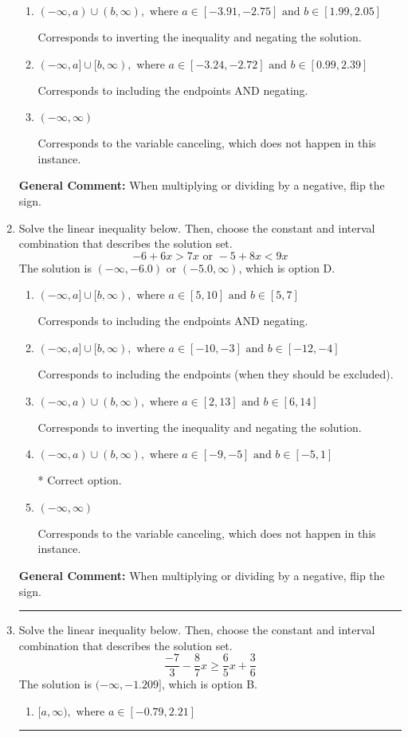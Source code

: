 \documentclass{extbook}[14pt]
\newcommand{\litem}[1]{\item #1

\rule{\textwidth}{0.4pt}}
\begin{document}
\begin{enumerate}
{\begin{enumerate}[label=\Alph*.]
 * Correct option.
\item \( (-\infty, a) \cup (b, \infty), \text{ where } a \in [-3.91, -2.75] \text{ and } b \in [1.99, 2.05] \)

Corresponds to inverting the inequality and negating the solution.
\item \( (-\infty, a] \cup [b, \infty), \text{ where } a \in [-3.24, -2.72] \text{ and } b \in [0.99, 2.39] \)

Corresponds to including the endpoints AND negating.
\item \( (-\infty, \infty) \)

Corresponds to the variable canceling, which does not happen in this instance.
\end{enumerate}

\textbf{General Comment:} When multiplying or dividing by a negative, flip the sign.
}
\litem{
Solve the linear inequality below. Then, choose the constant and interval combination that describes the solution set.
\[ -6 + 6 x > 7 x \text{ or } -5 + 8 x < 9 x \]The solution is \( (-\infty, -6.0) \text{ or } (-5.0, \infty) \), which is option D.\begin{enumerate}[label=\Alph*.]
\item \( (-\infty, a] \cup [b, \infty), \text{ where } a \in [5, 10] \text{ and } b \in [5, 7] \)

Corresponds to including the endpoints AND negating.
\item \( (-\infty, a] \cup [b, \infty), \text{ where } a \in [-10, -3] \text{ and } b \in [-12, -4] \)

Corresponds to including the endpoints (when they should be excluded).
\item \( (-\infty, a) \cup (b, \infty), \text{ where } a \in [2, 13] \text{ and } b \in [6, 14] \)

Corresponds to inverting the inequality and negating the solution.
\item \( (-\infty, a) \cup (b, \infty), \text{ where } a \in [-9, -5] \text{ and } b \in [-5, 1] \)

 * Correct option.
\item \( (-\infty, \infty) \)

Corresponds to the variable canceling, which does not happen in this instance.
\end{enumerate}

\textbf{General Comment:} When multiplying or dividing by a negative, flip the sign.
}
\litem{
Solve the linear inequality below. Then, choose the constant and interval combination that describes the solution set.
\[ \frac{-7}{3} - \frac{8}{7} x \geq \frac{6}{5} x + \frac{3}{6} \]The solution is \( (-\infty, -1.209] \), which is option B.\begin{enumerate}[label=\Alph*.]
\item \( [a, \infty), \text{ where } a \in [-0.79, 2.21] \)


\end{enumerate}}
\end{enumerate}
\end{document}
